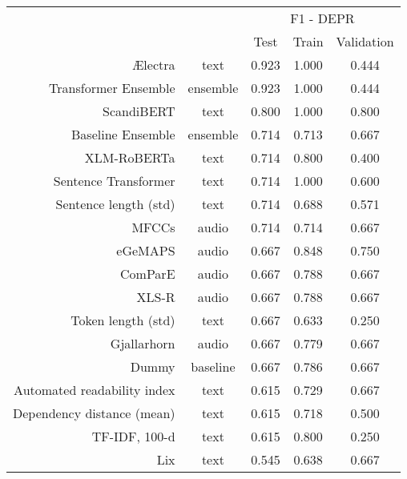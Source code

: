 \begin{tabular}{rc||ccc}
\toprule
\multicolumn{1}{c}{} & \multicolumn{1}{c}{} & \multicolumn{3}{c}{F1 - DEPR} \\
                                        &&      Test & Train & Validation \\
\midrule
\hline
                                Ælectra &     text &     0.923 & 1.000 &      0.444 \\
                   Transformer Ensemble & ensemble &     0.923 & 1.000 &      0.444 \\
                             ScandiBERT &     text &     0.800 & 1.000 &      0.800 \\
                      Baseline Ensemble & ensemble &     0.714 & 0.713 &      0.667 \\
                            XLM-RoBERTa &     text &     0.714 & 0.800 &      0.400 \\
                   Sentence Transformer &     text &     0.714 & 1.000 &      0.600 \\
                  Sentence length (std) &     text &     0.714 & 0.688 &      0.571 \\
                                  MFCCs &    audio &     0.714 & 0.714 &      0.667 \\
                                eGeMAPS &    audio &     0.667 & 0.848 &      0.750 \\
                                ComParE &    audio &     0.667 & 0.788 &      0.667 \\
                                  XLS-R &    audio &     0.667 & 0.788 &      0.667 \\
                     Token length (std) &     text &     0.667 & 0.633 &      0.250 \\
                            Gjallarhorn &    audio &     0.667 & 0.779 &      0.667 \\
                                  Dummy & baseline &     0.667 & 0.786 &      0.667 \\
            Automated readability index &     text &     0.615 & 0.729 &      0.667 \\
             Dependency distance (mean) &     text &     0.615 & 0.718 &      0.500 \\
                          TF-IDF, 100-d &     text &     0.615 & 0.800 &      0.250 \\
                                    Lix &     text &     0.545 & 0.638 &      0.667 \\

\end{tabular}
